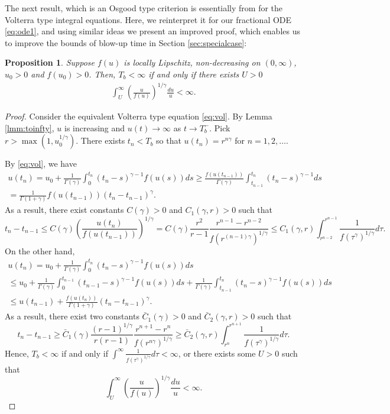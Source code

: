 \documentclass[12pt]{amsart}%
\newtheorem{pro}[thm]{Proposition}
\theoremstyle{definition}
\theoremstyle{remark}
\renewcommand{\ge}{\geqslant}
\renewcommand{\le}{\leqslant}
\begin{document}
The next result, which is an Osgood type criterion is essentially from \cite{by12} for the Volterra type integral equations. Here, we reinterpret it for our fractional ODE \eqref{eq:ode1}, and using similar ideas we present an improved proof, which enables us to improve the bounds of blow-up time in Section \ref{sec:specialcase}:
\begin{pro}\label{pro:blow-upcriteria}
Suppose $f(u)$ is locally Lipschitz, non-decreasing on $(0,\infty)$, $u_0>0$ and $f(u_0)>0$. Then, $T_b<\infty$ if and only if there exists $U>0$
\begin{gather}
\int_U^{\infty}\left(\frac{u}{f(u)}\right)^{1/\gamma}\frac{du}{u}<\infty.
\end{gather}
\end{pro}
\begin{proof}
Consider the equivalent Volterra type equation \eqref{eq:vol}. By Lemma \ref{lmm:toinfty}, $u$ is increasing and $u(t)\to \infty$ as $t\to T_b^-$. Pick $r>\max(1, u_0^{1/\gamma})$. There exists $t_n<T_b$ so that $u(t_n)=r^{n\gamma}$ for $n=1,2,\ldots$. 

By \eqref{eq:vol}, we have 
\begin{multline*}
u(t_n)=u_0+\frac{1}{\Gamma(\gamma)}\int_0^{t_n}(t_n-s)^{\gamma-1}f(u(s))ds
\ge \frac{f(u(t_{n-1}))}{\Gamma(\gamma)}\int_{t_{n-1}}^{t_n}(t_n-s)^{\gamma-1}ds\\
=\frac{1}{\Gamma(1+\gamma)}f(u(t_{n-1})) (t_n-t_{n-1})^{\gamma}.
\end{multline*}
As a result, there exist constants $C(\gamma)>0$ and $C_1(\gamma, r)>0$ such that
 \[
t_n-t_{n-1}\le C(\gamma)\left(\frac{u(t_n)}{f(u(t_{n-1}))}\right)^{1/\gamma}
=C(\gamma)\frac{r^2}{r-1}\frac{r^{n-1}-r^{n-2}}{f(r^{(n-1)\gamma})^{1/\gamma}}
\le C_1(\gamma,r)\int_{r^{n-2}}^{r^{n-1}}\frac{1}{f(\tau^{\gamma})^{1/\gamma}}d\tau.
\]
On the other hand, 
\begin{multline*}
u(t_n)=u_0+\frac{1}{\Gamma(\gamma)}\int_0^{t_n}(t_n-s)^{\gamma-1}f(u(s))ds \\
\le u_0+\frac{1}{\Gamma(\gamma)}\int_0^{t_{n-1}}(t_{n-1}-s)^{\gamma-1}f(u(s))ds+\frac{1}{\Gamma(\gamma)}\int_{t_{n-1}}^{t_{n}}(t_n-s)^{\gamma-1}f(u(s))ds\\
\le u(t_{n-1})+\frac{f(u(t_n))}{\Gamma(1+\gamma)}(t_n-t_{n-1})^{\gamma}.
\end{multline*}
As a result, there exist two constants $\bar{C}_1(\gamma)>0$ and $\bar{C}_2(\gamma, r)>0$ such that
\[
t_n-t_{n-1} \ge \bar{C}_1(\gamma)\frac{(r-1)^{1/\gamma}}{r(r-1)}\frac{r^{n+1}-r^{n}}{f(r^{n\gamma})^{1/\gamma}}\ge \bar{C}_2(\gamma, r)\int_{r^n}^{r^{n+1}}
\frac{1}{f(\tau^{\gamma})^{1/\gamma}}d\tau.
\]
Hence, $T_b<\infty$ if and only if $\int^{\infty}\frac{1}{f(\tau^{\gamma})^{1/\gamma}}d\tau<\infty$, or there exists some $U>0$ such that
\[
\int_U^{\infty}\left(\frac{u}{f(u)}\right)^{1/\gamma}\frac{du}{u}<\infty.
\]
\end{proof}
\end{document}
